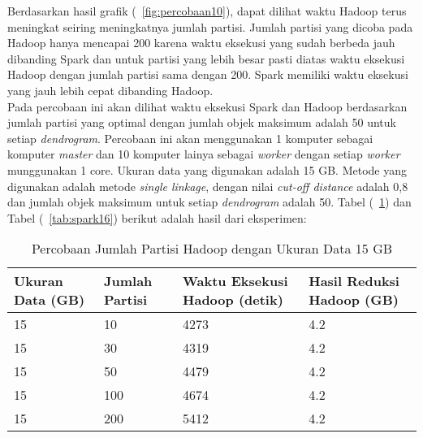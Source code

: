 Berdasarkan hasil grafik (~\ref{fig:percobaan10}), dapat dilihat waktu Hadoop terus meningkat seiring meningkatnya jumlah partisi. Jumlah partisi yang dicoba pada Hadoop hanya mencapai 200 karena waktu eksekusi yang sudah berbeda jauh dibanding Spark dan untuk partisi yang lebih besar pasti diatas waktu eksekusi Hadoop dengan jumlah partisi sama dengan 200. Spark memiliki waktu eksekusi yang jauh lebih cepat dibanding Hadoop.\\





Pada percobaan ini akan dilihat waktu eksekusi Spark dan Hadoop berdasarkan jumlah partisi yang optimal dengan jumlah objek maksimum adalah 50 untuk setiap \textit{dendrogram}. Percobaan ini akan menggunakan 1 komputer sebagai komputer \textit{master} dan 10 komputer lainya sebagai \textit{worker} dengan setiap \textit{worker} munggunakan 1 core. Ukuran data yang digunakan adalah 15 GB. Metode yang digunakan adalah metode \textit{single linkage}, dengan nilai \textit{cut-off distance} adalah 0,8 dan jumlah objek maksimum untuk setiap \textit{dendrogram} adalah 50. Tabel (~\ref{tab:spark15}) dan Tabel (~\ref{tab:spark16}) berikut adalah hasil dari eksperimen:





\begin{table}[H] 
	\centering 
	\caption{Percobaan Jumlah Partisi Hadoop dengan Ukuran Data 15 GB}
	\label{tab:spark15}
	\begin{tabular}{|p{3cm}|p{3cm}|p{4cm}|p{4cm}|}
\hline
Ukuran Data (GB) & Jumlah Partisi &  Waktu Eksekusi Hadoop (detik) & Hasil Reduksi Hadoop (GB)\\
\hline
15 & 10 & 4273  & 4.2  \\
\hline
15 & 30 & 4319  & 4.2  \\
\hline
15 & 50 & 4479  & 4.2  \\
\hline
15 & 100 & 4674  & 4.2  \\
\hline
15 & 200 & 5412 & 4.2  \\
\hline


\hline

	\end{tabular} 
\end{table}




